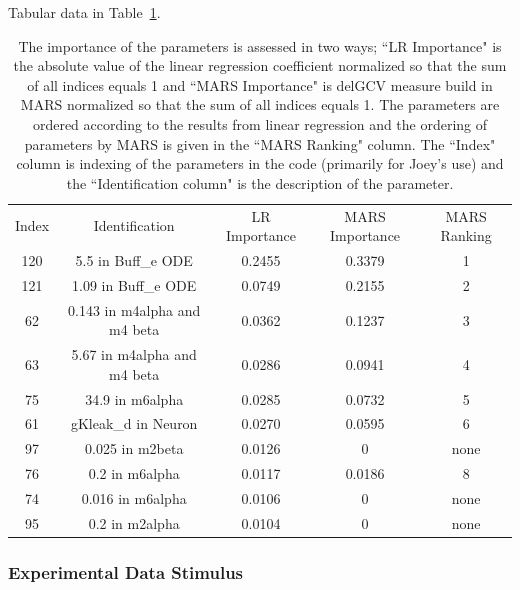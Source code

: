 \documentclass[12pt]{article}
\numberwithin{equation}{section}
\begin{document}
Tabular data in Table~\ref{qoi_K_AC_Max_rec}.

\begin{table}[h]
\centering
\begin{tabular}{ccccc}
Index & Identification & LR Importance & MARS Importance & MARS Ranking \\
120 & 5.5 in Buff\_e ODE & 0.2455 & 0.3379 & 1\\
121 & 1.09 in Buff\_e ODE & 0.0749 & 0.2155 & 2\\
62 & 0.143 in m4alpha and m4 beta &  0.0362 & 0.1237 & 3\\
63 &   5.67 in m4alpha and m4 beta & 0.0286 & 0.0941 & 4\\
75 & 34.9 in m6alpha & 0.0285 & 0.0732 & 5\\
61 & gKleak\_d in Neuron & 0.0270 & 0.0595 & 6\\
97 & 0.025 in m2beta & 0.0126 & 0 & none\\
76 & 0.2 in m6alpha & 0.0117 &  0.0186 & 8\\
74 & 0.016 in m6alpha & 0.0106 & 0 & none\\
95 & 0.2 in m2alpha & 0.0104 & 0 & none\\
\end{tabular}
\caption{The importance of the parameters is assessed in two ways; ``LR Importance" is the absolute value of the linear regression coefficient normalized so that the sum of all indices equals 1 and ``MARS Importance" is delGCV measure build in MARS normalized so that the sum of all indices equals 1. The parameters are ordered according to the results from linear regression and the ordering of parameters by MARS is given in the ``MARS Ranking" column. The ``Index" column is indexing of the parameters in the code (primarily for Joey's use) and the ``Identification column" is the description of the parameter.}
\label{qoi_K_AC_Max_rec}
\end{table}

\newpage

\subsubsection{Experimental Data Stimulus}
\end{document}
